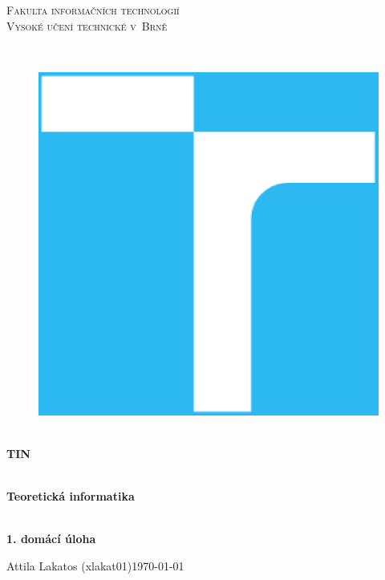 \documentclass[11pt,a4paper]{article}
\begin{document}
\begin{titlepage}

    \begin{center}
        \vfill {%
            \Huge{%
                \textsc{%
                    Fakulta informačních technologií\\[3mm]%
                    Vysoké učení technické v~Brně%
                }%
            }%
        }%

        \hfill\\[15mm]

        \begin{figure}[!h]
            \centering
            \includegraphics[scale=0.3]{vutbr-fit-logo.eps}
        \end{figure}

        \hfill\\[10mm]

        \Huge{
            \textbf{
                TIN
            }
        }

        \hfill\\[-10mm]

        \huge{
            \textbf{
                Teoretická informatika
            }
        }

        \hfill\\[10mm]

        \LARGE{
            \textbf{
                1. domácí úloha
            }
        }
        \vfill

    \end{center}

        \Large{
            Attila Lakatos (xlakat01)\hfill \today
        }

\end{titlepage}
\end{document}
